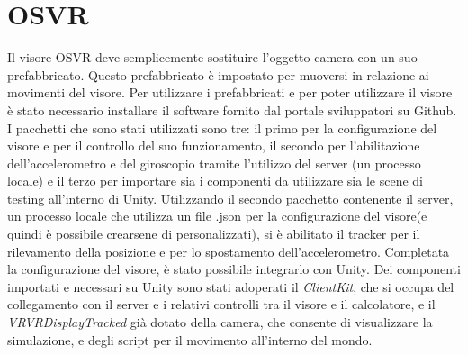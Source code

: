 \section{OSVR}
Il visore OSVR deve semplicemente sostituire l'oggetto camera con un suo prefabbricato. Questo prefabbricato è impostato per muoversi in relazione ai movimenti del visore. Per utilizzare i prefabbricati e per poter utilizzare il visore è stato necessario installare il software fornito dal portale sviluppatori su Github. I pacchetti che sono stati utilizzati sono tre: il primo per la configurazione del visore e per il controllo del suo funzionamento, il secondo per l'abilitazione dell'accelerometro e del giroscopio tramite l'utilizzo del server (un processo locale) e il terzo per importare sia i componenti da utilizzare sia le scene di testing all'interno di Unity. Utilizzando il secondo pacchetto contenente il server, un processo locale che utilizza un file .json per la configurazione del visore(e quindi è possibile crearsene di personalizzati), si è abilitato il tracker per il rilevamento della posizione e per lo spostamento dell'accelerometro. Completata la configurazione del visore, è stato possibile integrarlo con Unity. Dei componenti importati e necessari su Unity sono stati adoperati il \textit{ClientKit}, che si occupa del collegamento con il server e i relativi controlli tra il visore e il calcolatore, e il \textit{VRVRDisplayTracked} già dotato della camera, che consente di visualizzare la simulazione, e degli script per il movimento all'interno del mondo.


























%

